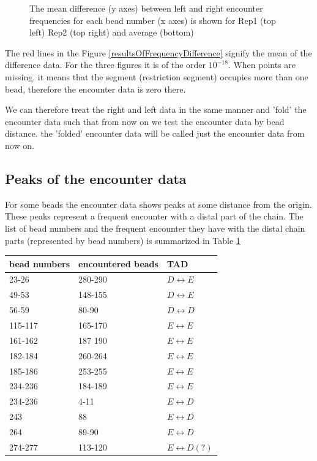 \documentclass[12pt]{paper}
\begin{document}
\begin{figure}[H]
\caption{\scriptsize{ The mean difference (y axes) between left and right encounter frequencies for each bead number (x axes) is shown for Rep1 (top left) Rep2 (top right) and average (bottom)}}
\end{figure}  
The red lines in the Figure \ref{resultsOfFrequencyDifference} signify the mean of the difference data. For the three figures it is of the order $10^{-18}$. When points are missing, it means that the segment (restriction segment) occupies more than one bead, therefore the encounter data is zero there. 

We can therefore treat the right and left data in the same manner and 'fold' the encounter data such that from now on we test the encounter data by bead distance. the 'folded' encounter data will be called just the encounter data from now on. 

\subsection{Peaks of the encounter data}
For some beads the encounter data shows peaks at some distance from the origin. 
These peaks represent a frequent encounter with a distal part of the chain. The list of bead numbers and the frequent encounter they have with the distal chain parts (represented by bead numbers) is summarized in Table \ref{nonNeighborBeadEncounterTable}
\begin{table}[H]\label{nonNeighborBeadEncounterTable}
\begin{tabular}{l l l}
bead numbers & encountered beads & TAD\\
\hline
23-26   & 280-290 & $D\leftrightarrow E$\\
49-53   & 148-155 & $D\leftrightarrow E$\\
56-59   & 80-90   & $D\leftrightarrow D$\\
115-117 & 165-170 & $E\leftrightarrow E$\\
161-162 & 187 190 & $E\leftrightarrow E$\\
182-184 & 260-264 & $E\leftrightarrow E$\\
185-186 & 253-255 & $E\leftrightarrow E$\\
234-236 & 184-189 & $E\leftrightarrow E$\\
234-236 & 4-11    & $E\leftrightarrow D$\\
243     & 88      & $E\leftrightarrow D$\\
264     & 89-90   & $E\leftrightarrow D$\\
274-277 & 113-120 & $E\leftrightarrow D(?)$
\end{tabular}
\end{table}
\end{document}
